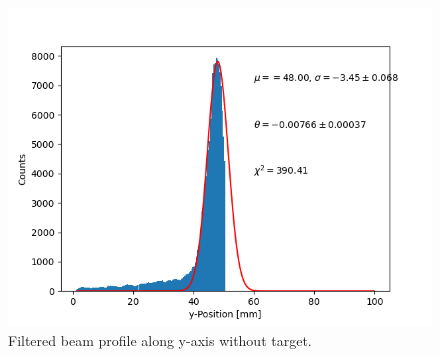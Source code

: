 \documentclass[t,9pt]{beamer}
\begin{document}
        \begin{frame}
                \vfill
                \begin{figure}
                        \centering
                        \includegraphics[width=.8\textwidth]{../src/elsa/finished_plots/no target.png}
                        \caption{Filtered beam profile along y-axis without target.}
                \end{figure}
        \end{frame}
\end{document}
